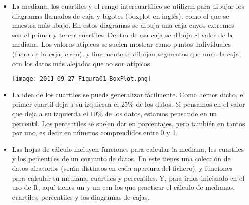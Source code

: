\begin{itemize}
    \item La mediana, los cuartiles y el rango intercuartílico se utilizan para dibujar los diagramas llamados de {\sf caja y bigotes} (boxplot en inglés), como el que se muestra más abajo. En estos diagramas se dibuja una caja cuyos extremos son el primer y tercer cuartiles. Dentro de esa caja se dibuja el valor de la mediana. Los valores atípicos se suelen mostrar como puntos individuales (fuera de la caja, claro), y finalmente se dibujan segmentos que unen la caja con los datos más alejados que no son atípicos.
         \begin{center}
         \texttt{[image: 2011\_09\_27\_Figura01\_BoxPlot.png]}
         \end{center}

    \item La idea de los cuartiles se puede generalizar fácilmente. Como hemos dicho, el primer cuartil deja a su izquierda el $25\%$ de los datos. Si pensamos en el valor que deja a su izquierda el $10\%$ de los datos, estamos pensando en un {\sf percentil.} Los percentiles se suelen dar en porcentajes, pero también en tantos por uno, es decir en números comprendidos entre 0 y 1.

    \item Las hojas de cálculo incluyen funciones para calcular la mediana, los cuartiles y los percentiles de un conjunto de datos. En este  tienes una colección de datos aleatorios (serán distintos en cada apertura del fichero), y funciones para calcular su mediana, cuartiles y percentiles. Y, para irnos iniciando en el uso de R, aquí tienes un  y un  con los que practicar el cálculo de medianas, cuartiles, percentiles y los diagramas de cajas.
\end{itemize}


%
%
%




